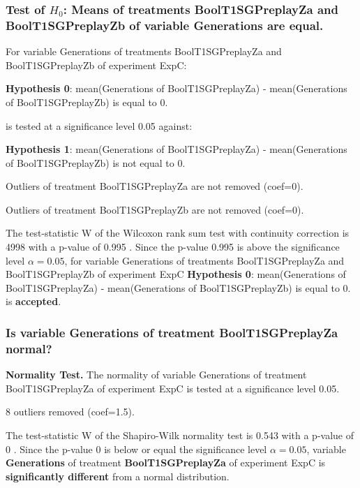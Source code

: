 \documentclass[18pt,c]{beamer}
\begin{document}
\begin{frame}[t]
 \frametitle{Test of $H_{0}$: Means of treatments BoolT1SGPreplayZa and BoolT1SGPreplayZb of variable Generations are equal. }
 \scriptsize
 For variable Generations of treatments BoolT1SGPreplayZa and BoolT1SGPreplayZb of experiment ExpC:

\vspace{1mm}
{\bf Hypothesis 0}: mean(Generations of BoolT1SGPreplayZa) - mean(Generations of BoolT1SGPreplayZb) is equal to 0.


 \begin{center} is tested at a significance level 0.05 against: \end{center}

{\bf Hypothesis 1}: mean(Generations of BoolT1SGPreplayZa) - mean(Generations of BoolT1SGPreplayZb) is not equal to 0.
\vspace{1mm}
\vspace{1mm}

 Outliers of treatment BoolT1SGPreplayZa  are not removed (coef=0).

 Outliers of treatment BoolT1SGPreplayZb  are not removed (coef=0).
\vspace{1mm}
 
 The test-statistic W of the Wilcoxon rank sum test with continuity correction is 4998 with a p-value of 0.995 .
 Since the p-value 0.995 is above the significance level $\alpha= 0.05 $,
 for variable Generations of treatments BoolT1SGPreplayZa and BoolT1SGPreplayZb of experiment ExpC 
 {\bf Hypothesis 0}: mean(Generations of BoolT1SGPreplayZa) - mean(Generations of BoolT1SGPreplayZb) is equal to 0.
is {\bf accepted}.

 \end{frame}
\begin{frame}[t]
 \frametitle{Is variable Generations of treatment BoolT1SGPreplayZa normal?}
 {\bf Normality Test.} The normality of variable Generations of treatment BoolT1SGPreplayZa of experiment ExpC is tested at a significance level 0.05.

 8 outliers removed (coef=1.5).
 
 The test-statistic W of the Shapiro-Wilk normality test is 0.543 with a p-value of 0 .
 Since the p-value 0 is below or equal the significance level $\alpha= 0.05 $,
 variable {\bf  Generations } of treatment {\bf  BoolT1SGPreplayZa } of experiment ExpC  is {\bf significantly different} from a normal distribution.

 \end{frame}
\end{document}
